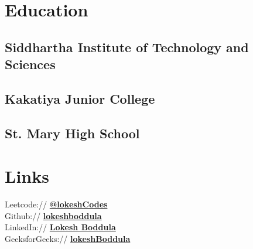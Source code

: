 \documentclass[]{deedy-resume-openfont}
\begin{document}
%
%

%
%

%
%

\begin{minipage}[t]{0.33\textwidth} 


\section{Education} 

\subsection{Siddhartha Institute of \newline Technology and Sciences}
\sectionsep

\subsection{Kakatiya Junior College}
\sectionsep

\subsection{St. Mary High School}
\sectionsep


\section{Links} 
Leetcode:// \href{https://leetcode.com/lokeshCodes/}{\bf @lokeshCodes} \\
Github:// \href{https://github.com/lokeshboddula}{\bf lokeshboddula} \\
LinkedIn:// \href{https://www.linkedin.com/in/lokesh-boddula/}{\bf 
Lokesh Boddula} \\
GeeksforGeeks://  \href{https://auth.geeksforgeeks.org/user/lokesh_22/}{\bf lokeshBoddula} \\



\end{minipage}
\end{document}
